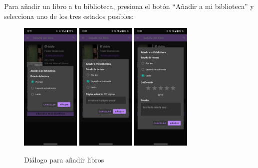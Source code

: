 \documentclass[a4paper,10pt]{report}
\begin{document}
      Para añadir un libro a tu biblioteca, presiona el botón ``Añadir a mi biblioteca'' y selecciona uno de los tres estados posibles:
      
      \begin{figure}[H]
        \centering
        \includegraphics[width=0.25\textwidth]{.img/libro-porleer.png}
        \includegraphics[width=0.25\textwidth]{.img/libro-leyendo.png}
        \includegraphics[width=0.25\textwidth]{.img/libro-leido.png}
        \caption{Diálogo para añadir libros}
        \label{fig:libro-porleer}
      \end{figure}
      
\end{document}
